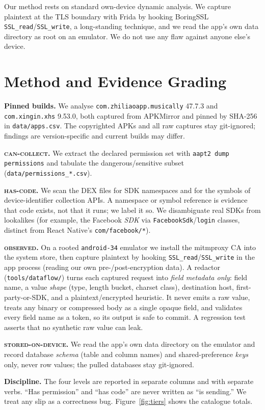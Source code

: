 \documentclass[conference,10pt]{IEEEtran}
\newcommand{\code}[1]{\texttt{\small #1}}
\newcommand{\cancollect}{\textsc{can-collect}}
\newcommand{\hascode}{\textsc{has-code}}
\newcommand{\observed}{\textsc{observed}}
\newcommand{\stored}{\textsc{stored-on-device}}
\begin{document}
Our method rests on standard own-device dynamic analysis. We capture plaintext at the TLS boundary with Frida by hooking BoringSSL \code{SSL\_read}/\code{SSL\_write}, a long-standing technique, and we read the app's own data directory as root on an emulator. We do not use any flaw against anyone else's device.

\section{Method and Evidence Grading}
\label{sec:method}
\textbf{Pinned builds.} We analyse \code{com.zhiliaoapp.musically} 47.7.3 and \code{com.xingin.xhs} 9.53.0, both captured from APKMirror and pinned by SHA-256 in \code{data/apps.csv}. The copyrighted APKs and all raw captures stay git-ignored; findings are version-specific and current builds may differ.

\textbf{\cancollect{}.} We extract the declared permission set with \code{aapt2 dump permissions} and tabulate the dangerous/sensitive subset (\code{data/permissions\_*.csv}).

\textbf{\hascode{}.} We scan the DEX files for SDK namespaces and for the symbols of device-identifier collection APIs. A namespace or symbol reference is evidence that code exists, not that it runs; we label it so. We disambiguate real SDKs from lookalikes (for example, the Facebook \emph{SDK} via \code{FacebookSdk}/\code{login} classes, distinct from React Native's \code{com/facebook/*}).

\textbf{\observed{}.} On a rooted \code{android-34} emulator we install the mitmproxy CA into the system store, then capture plaintext by hooking \code{SSL\_read}/\code{SSL\_write} in the app process (reading our own pre-/post-encryption data). A redactor (\code{tools/dataflow/}) turns each captured request into \emph{field metadata only}: field name, a value \emph{shape} (type, length bucket, charset class), destination host, first-party-or-SDK, and a plaintext/encrypted heuristic. It never emits a raw value, treats any binary or compressed body as a single opaque field, and validates every field name as a token, so its output is safe to commit. A regression test asserts that no synthetic raw value can leak.

\textbf{\stored{}.} We read the app's own data directory on the emulator and record database \emph{schema} (table and column names) and shared-preference \emph{keys} only, never row values; the pulled databases stay git-ignored.

\textbf{Discipline.} The four levels are reported in separate columns and with separate verbs. ``Has permission'' and ``has code'' are never written as ``is sending.'' We treat any slip as a correctness bug. Figure~\ref{fig:tiers} shows the catalogue totals.
\end{document}
